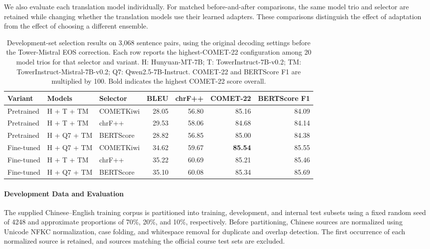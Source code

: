 \documentclass[11pt]{article}
\begin{document}
We also evaluate each translation model individually. For matched before-and-after comparisons, the same model trio and selector are retained while changing whether the translation models use their learned adapters. These comparisons distinguish the effect of adaptation from the effect of choosing a different ensemble.

\begin{table}[t]
\centering
\setlength{\tabcolsep}{5pt}
\begin{tabular}{lllrrrr}
\hline
Variant & Models & Selector & BLEU & chrF++ & COMET-22 & BERTScore F1 \\
\hline
Pretrained & H + T + TM & COMETKiwi & 28.05 & 56.80 & 85.16 & 84.09 \\
Pretrained & H + T + TM & chrF++ & 29.53 & 58.06 & 84.68 & 84.14 \\
Pretrained & H + Q7 + TM & BERTScore & 28.82 & 56.85 & 85.00 & 84.38 \\
\hline
Fine-tuned & H + Q7 + TM & COMETKiwi & 34.62 & 59.67 & \textbf{85.54} & 85.55 \\
Fine-tuned & H + T + TM & chrF++ & 35.22 & 60.69 & 85.21 & 85.46 \\
Fine-tuned & H + Q7 + TM & BERTScore & 35.10 & 60.08 & 85.34 & 85.69 \\
\hline
\end{tabular}
\caption{Development-set selection results on 3,068 sentence pairs, using the original decoding settings before the Tower-Mistral EOS correction. Each row reports the highest-COMET-22 configuration among 20 model trios for that selector and variant.
H: Hunyuan-MT-7B; T: TowerInstruct-7B-v0.2; TM: TowerInstruct-Mistral-7B-v0.2; Q7: Qwen2.5-7B-Instruct. COMET-22 and BERTScore F1 are multiplied by 100. Bold indicates the highest COMET-22 score overall.}
\label{tab:dev_ensemble_selection}
\end{table}

\paragraph{Development Data and Evaluation}
The supplied Chinese--English training corpus is partitioned into training, development, and internal test subsets using a fixed random seed of 4248 and approximate proportions of 70\%, 20\%, and 10\%, respectively. Before partitioning, Chinese sources are normalized using Unicode NFKC normalization, case folding, and whitespace removal for duplicate and overlap detection. The first occurrence of each normalized source is retained, and sources matching the official course test sets are excluded.
\end{document}
